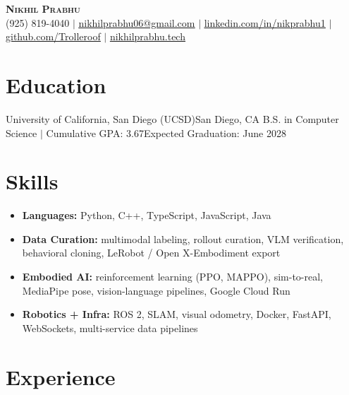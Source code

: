 




\begin{center}
    \textbf{\Large \scshape Nikhil Prabhu} \\ \vspace{1pt}
    \small (925) 819-4040 $|$ \href{mailto:nikhilprabhu06@gmail.com}{\underline{nikhilprabhu06@gmail.com}} $|$ 
    \href{https://www.linkedin.com/in/nikprabhu1/}{\underline{linkedin.com/in/nikprabhu1}} $|$
    \href{https://github.com/Trolleroof}{\underline{github.com/Trolleroof}} $|$
    \href{https://nikhilprabhu.tech}{\underline{nikhilprabhu.tech}}
\end{center}
\small

\section{Education}
  \resumeSubHeadingListStart
    \resumeSubheading
      {University of California, San Diego (UCSD)}{San Diego, CA}
      {B.S. in Computer Science $|$ Cumulative GPA: 3.67}{Expected Graduation: June 2028}
  \resumeSubHeadingListEnd
\vspace{-4pt}

\section{Skills}
\begin{itemize}[leftmargin=0.15in, label={}, nosep, topsep=2pt, itemsep=3pt, parsep=0pt]
  \item \textbf{Languages:} Python, C++, TypeScript, JavaScript, Java
  \item \textbf{Data Curation:} multimodal labeling, rollout curation, VLM verification, behavioral cloning, LeRobot / Open X-Embodiment export
  \item \textbf{Embodied AI:} reinforcement learning (PPO, MAPPO), sim-to-real, MediaPipe pose, vision-language pipelines, Google Cloud Run
  \item \textbf{Robotics + Infra:} ROS 2, SLAM, visual odometry, Docker, FastAPI, WebSockets, multi-service data pipelines
\end{itemize}
\vspace{-4pt}

\section{Experience}
  \resumeSubHeadingListStart

